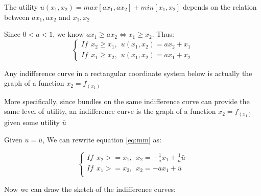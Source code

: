 \documentclass{article}
\begin{document}
The utility $u(x_1, x_2) = max[ax_1, ax_2] + min[x_1, x_2]$ depends on the relation between $ax_1, ax_2$ and $x_1, x_2$

Since $0 < a < 1$, we know $ax_1 \ge ax_2 \iff x_1 \ge x_2$. Thus:
\begin{equation}
  \begin{cases}
If \ \ x_2 \ge x_1 ,\ \ u(x_1, x_2) = ax_2 + x_1  \\
If \ \ x_1 \ge x_2 ,\ \ u(x_1, x_2) = ax_1 + x_2
  \end{cases}
 \label{eq:mm}
\end{equation}

\begin{mdframed}[backgroundcolor=blue!20,linecolor=white]

Any indifference curve in a rectangular coordinate system below is actually the graph of
a function $x_2 = f_(x_1)$

{\centering
{}
\label{fig:1_27_coor}}

More specifically, since bundles on the same indifference curve can provide the same level of utility,
an indifference curve is the graph of a function $x_2 = f_(x_1)$ given some utility $\bar{u}$

Given  $u = \bar{u}$, We can rewrite equation \ref{eq:mm} as:

\begin{equation}
  \begin{cases}
    If \ \ x_2 >= x_1 ,\ \ x_2 = -\frac{1}{a}x_1 + \frac{1}{a}\bar{u} \\
    If \ \ x_1 >= x_2 ,\ \ x_2 = -ax_1 + \bar{u} \\
  \end{cases}
\end{equation}

Now we can draw the sketch of the indifference curves:

{\centering
{}}
\end{mdframed}
\end{document}
